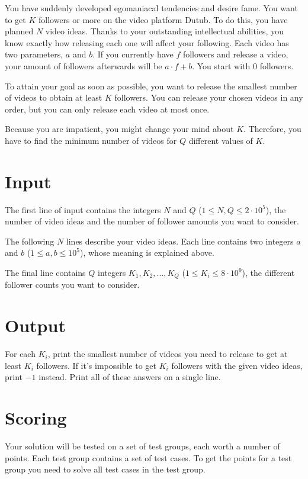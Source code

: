
\noindent
You have suddenly developed egomaniacal tendencies and desire fame. You want to get $K$ followers or more on the video platform
Dutub. To do this, you have planned $N$ video ideas. Thanks to your outstanding intellectual abilities, you know exactly
how releasing each one will affect your following. Each video has two parameters, $a$ and $b$. If you currently have $f$ followers
and release a video, your amount of followers afterwards will be $a \cdot f + b$. You start with $0$ followers.

To attain your goal as soon as possible, you want to release the smallest number of videos to obtain at least $K$ followers.
You can release your chosen videos in any order, but you can only release each video at most once.

Because you are impatient, you might change your mind about $K$. Therefore, you have to find the minimum number of videos
for $Q$ different values of $K$.

\section*{Input}
The first line of input contains the integers $N$ and $Q$ ($1 \le N, Q \le 2 \cdot 10^5$), the number of video ideas
and the number of follower amounts you want to consider.

The following $N$ lines describe your video ideas. Each line contains two integers $a$ and $b$ ($1 \leq a, b \leq 10^5$),
whose meaning is explained above.

The final line contains $Q$ integers $K_1, K_2, \dots, K_Q$ ($1 \leq K_i \leq 8 \cdot 10^9$), the different follower counts
you want to consider.

\section*{Output}
For each $K_i$, print the smallest number of videos you need to release to get at least $K_i$ followers. If it's impossible
to get $K_i$ followers with the given video ideas, print $-1$ instead.
Print all of these answers on a single line.

\section*{Scoring}
Your solution will be tested on a set of test groups, each worth a number of points. Each test group contains
a set of test cases. To get the points for a test group you need to solve all test cases in the test group.

